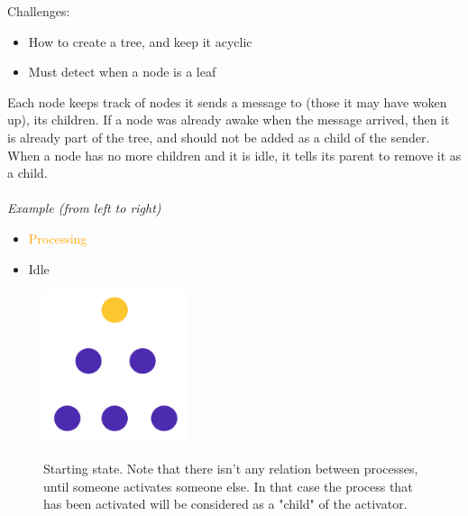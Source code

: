 \documentclass[10pt,a4paper]{article}
\begin{document}
Challenges:
\begin{itemize}
	\item How to create a tree, and keep it acyclic
	\item Must detect when a node is a leaf
\end{itemize}
Each node keeps track of nodes it sends a message to (those it may have woken up), its children. If a node was already awake when the message arrived, then it is already part of the tree, and should not be added as a child of the sender. When a node has no more children and it is idle, it tells its parent to remove it as a child. \\ \\
\textit{Example (from left to right)}
\begin{itemize}
	\item \textcolor{Orange}{Processing}
	\item \textcolor{NavyBlue}{Idle}
\end{itemize}
\begin{figure}[h!]
 \hfill \includegraphics[width=120pt]{images/di-sch1.png}\hspace*{\fill}
  \label{fig:di-sch1}
  \caption{Starting state. Note that there isn't any relation between processes, until someone activates someone else. In that case the process that has been activated will be considered as a "child" of the activator.}
\end{figure}
\end{document}
